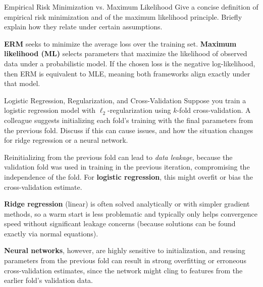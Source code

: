\documentclass{article}
\begin{document}
\begin{exercise}{Empirical Risk Minimization vs. Maximum Likelihood}
  Give a concise definition of empirical risk minimization and of the maximum likelihood principle. Briefly explain how they relate under certain assumptions.

  \begin{solution}
    \textbf{ERM} seeks to minimize the average loss over the training set.  
    \textbf{Maximum likelihood (ML)} selects parameters that maximize the likelihood of observed data under a probabilistic model.  
    If the chosen loss is the negative log-likelihood, then ERM is equivalent to MLE, meaning both frameworks align exactly under that model.
  \end{solution}
\end{exercise}

\begin{exercise}{Logistic Regression, Regularization, and Cross-Validation}
  Suppose you train a logistic regression model with $\ell_2$-regularization using $k$-fold cross-validation. A colleague suggests initializing each fold's training with the final parameters from the previous fold. Discuss if this can cause issues, and how the situation changes for ridge regression or a neural network.

  \begin{solution}
    Reinitializing from the previous fold can lead to \emph{data leakage}, because the validation fold was used in training in the previous iteration, compromising the independence of the fold. For \textbf{logistic regression}, this might overfit or bias the cross-validation estimate.  

    \textbf{Ridge regression} (linear) is often solved analytically or with simpler gradient methods, so a warm start is less problematic and typically only helps convergence speed without significant leakage concerns (because solutions can be found exactly via normal equations).  

    \textbf{Neural networks}, however, are highly sensitive to initialization, and reusing parameters from the previous fold can result in strong overfitting or erroneous cross-validation estimates, since the network might cling to features from the earlier fold’s validation data.
  \end{solution}
\end{exercise}
\end{document}

